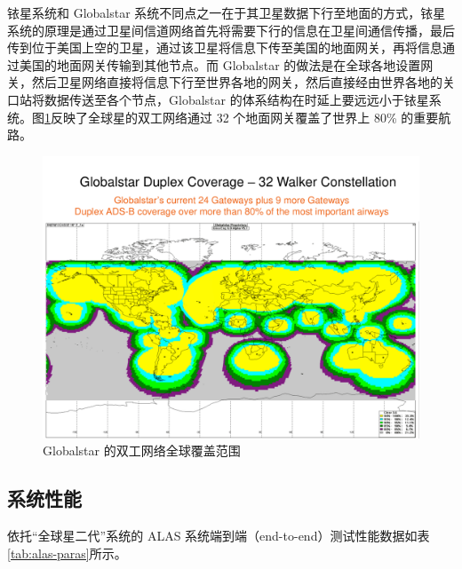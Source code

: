 
铱星系统和 Globalstar 系统不同点之一在于其卫星数据下行至地面的方式，铱星系统的原理是通过卫星间信道网络首先将需要下行的信息在卫星间通信传播，最后传到位于美国上空的卫星，通过该卫星将信息下传至美国的地面网关，再将信息通过美国的地面网关传输到其他节点。而 Globalstar 的做法是在全球各地设置网关，然后卫星网络直接将信息下行至世界各地的网关，然后直接经由世界各地的关口站将数据传送至各个节点，Globalstar 的体系结构在时延上要远远小于铱星系统。图\ref{fig:31-Globalstar-8}反映了全球星的双工网络通过 32 个地面网关覆盖了世界上 80\% 的重要航路。

\begin{figure}[!htb]
\centering
\includegraphics[width=15cm]{pic/31-Globalstar-8.pdf}
\caption{Globalstar 的双工网络全球覆盖范围\protect\footnotemark}
\label{fig:31-Globalstar-8}
\end{figure}


\subsection{系统性能}

依托“全球星二代”系统的 ALAS 系统端到端（end-to-end）测试性能数据如表\ref{tab:alas-paras}所示。

